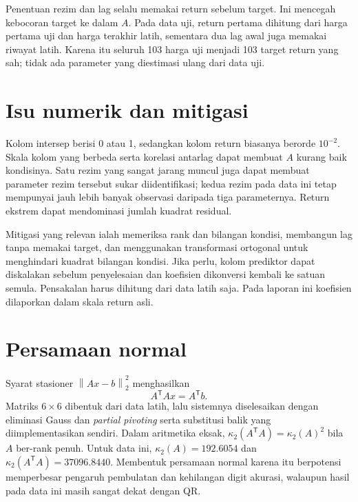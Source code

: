 \documentclass[11pt,a4paper]{article}
\newcommand{\norm}[1]{\left\lVert #1\right\rVert_2}
\begin{document}
Penentuan rezim dan lag selalu memakai return sebelum target. Ini mencegah kebocoran target ke dalam $A$. Pada data uji, return pertama dihitung dari harga pertama uji dan harga terakhir latih, sementara dua lag awal juga memakai riwayat latih. Karena itu seluruh 103 harga uji menjadi 103 target return yang sah; tidak ada parameter yang diestimasi ulang dari data uji.

\section{Isu numerik dan mitigasi}
Kolom intersep berisi 0 atau 1, sedangkan kolom return biasanya berorde $10^{-2}$. Skala kolom yang berbeda serta korelasi antarlag dapat membuat $A$ kurang baik kondisinya. Satu rezim yang sangat jarang muncul juga dapat membuat parameter rezim tersebut sukar diidentifikasi; kedua rezim pada data ini tetap mempunyai jauh lebih banyak observasi daripada tiga parameternya. Return ekstrem dapat mendominasi jumlah kuadrat residual.

Mitigasi yang relevan ialah memeriksa rank dan bilangan kondisi, membangun lag tanpa memakai target, dan menggunakan transformasi ortogonal untuk menghindari kuadrat bilangan kondisi. Jika perlu, kolom prediktor dapat diskalakan sebelum penyelesaian dan koefisien dikonversi kembali ke satuan semula. Pensakalan harus dihitung dari data latih saja. Pada laporan ini koefisien dilaporkan dalam skala return asli.

\section{Persamaan normal}
Syarat stasioner $\norm{Ax-b}^{2}$ menghasilkan
\begin{equation}
A^\mathsf{T}Ax=A^\mathsf{T}b.
\end{equation}
Matriks $6\times6$ dibentuk dari data latih, lalu sistemnya diselesaikan dengan eliminasi Gauss dan \emph{partial pivoting} serta substitusi balik yang diimplementasikan sendiri. Dalam aritmetika eksak, $\kappa_2(A^\mathsf{T}A)=\kappa_2(A)^2$ bila $A$ ber-rank penuh. Untuk data ini, $\kappa_2(A)=192.6054$ dan $\kappa_2(A^\mathsf{T}A)=37096.8440$. Membentuk persamaan normal karena itu berpotensi memperbesar pengaruh pembulatan dan kehilangan digit akurasi, walaupun hasil pada data ini masih sangat dekat dengan QR.
\end{document}
